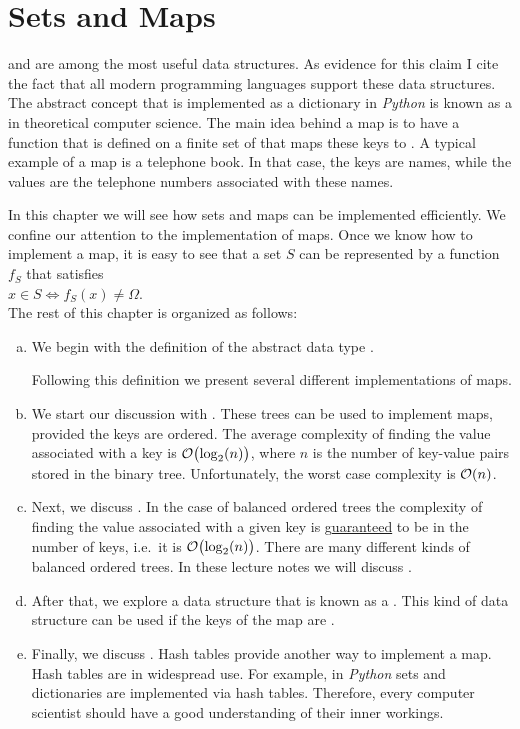 \chapter{Sets and Maps}
 and  are among the most useful data structures.  As evidence for this claim I
cite the fact that all modern programming languages support these data structures.
The abstract concept that is implemented as a dictionary in \textsl{Python} is known as a 
 in theoretical computer science. 
The main idea behind a map is to have a function that is defined on a finite set of  that
maps these keys to .  A typical example of a map is a telephone book.  In that case, the keys
are names, while the values are the telephone numbers associated with these names.

In this chapter we will see how sets and maps can be implemented efficiently.  We confine our attention to the
implementation of maps.  Once we know how to implement a map, it is easy to see that a set $S$ can be
represented by a function $f_S$ that satisfies 
\\[0.2cm]
\hspace*{1.3cm}
$x \in S \Leftrightarrow f_S(x) \not= \Omega$.
\\[0.2cm]
The rest of this chapter is organized as follows:
\begin{enumerate}[(a)]
\item We begin with the definition of the abstract data type . 
    
      Following this definition we present several different implementations of maps. 
\item We start our discussion with .  These trees can be used to implement maps,
      provided the keys are ordered.  The average complexity of finding the value associated with a key
      is $\mathcal{O}\bigl(\log_2(n)\bigr)$, where $n$ is the number of key-value pairs stored in the binary tree.
      Unfortunately, the worst case complexity  is $\mathcal{O}(n)$.
\item Next, we discuss .  In the case of balanced ordered trees the
      complexity of finding the value associated with a given key is g\underline{uaranteed} to be
       in the number of keys, i.e.~it is $\mathcal{O}\bigl(\log_2(n)\bigr)$.
      There are many different kinds of balanced ordered trees.  In these lecture notes we will discuss
      . 
\item After that, we explore a data structure that is known as a .  This kind of data structure can
      be used if the keys of the map are . 
\item Finally, we discuss .  Hash tables provide another way to implement a map.
      Hash tables are in widespread use.  For example, in \textsl{Python} sets and dictionaries are
      implemented via hash tables.  Therefore, every computer scientist should have a good understanding of
      their inner workings. 
\end{enumerate}

